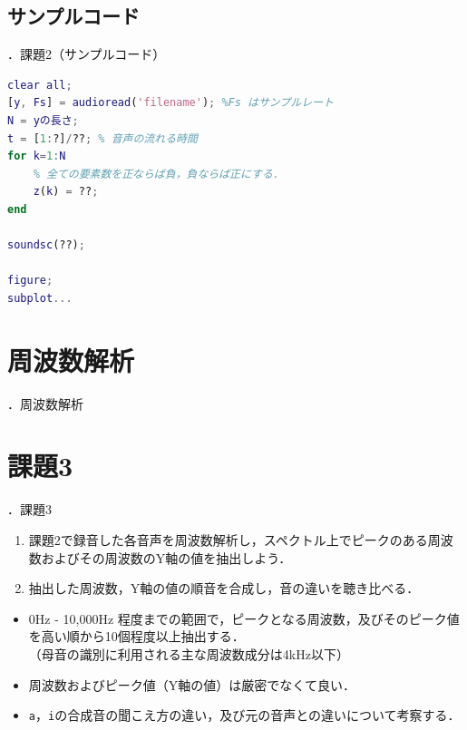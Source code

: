\documentclass[aspectratio=43]{beamer}
\newcommand{\showsec}{\thesection ．}
\begin{document}
\subsection{サンプルコード}
\begin{frame}[t,containsverbatim]{\showsec 課題2（サンプルコード）}
    \begin{lstlisting}[language={Matlab}]
clear all;
[y, Fs] = audioread('filename'); %Fs はサンプルレート
N = yの長さ;
t = [1:?]/??; % 音声の流れる時間
for k=1:N
    % 全ての要素数を正ならば負，負ならば正にする．
    z(k) = ??;
end

soundsc(??);

figure;
subplot...
    \end{lstlisting}
\end{frame}
\section{周波数解析}
\begin{frame}{\showsec 周波数解析}

\end{frame}
\section{課題3}
\begin{frame}[t]{\showsec 課題3}
    \begin{exampleblock}{}
        \begin{enumerate}
            \item 課題2で録音した各音声を周波数解析し，スペクトル上でピークのある周波数およびその周波数のY軸の値を抽出しよう．
            \item 抽出した周波数，Y軸の値の順音を合成し，音の違いを聴き比べる．
        \end{enumerate}
    \end{exampleblock}
    \dotfill
    \begin{itemize}
        \item 0Hz - 10,000Hz 程度までの範囲で，ピークとなる周波数，及びそのピーク値を高い順から10個程度以上抽出する．\\
              （母音の識別に利用される主な周波数成分は4kHz以下）
        \item 周波数およびピーク値（Y軸の値）は厳密でなくて良い．
        \item \texttt{a}，\texttt{i}の合成音の聞こえ方の違い，及び元の音声との違いについて考察する．
    \end{itemize}
\end{frame}
\end{document}
